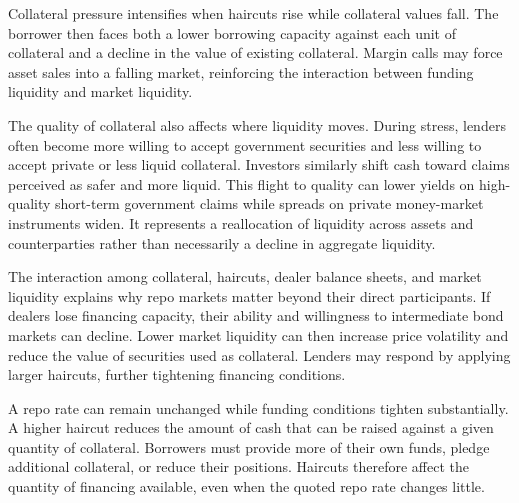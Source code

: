 Collateral pressure intensifies when haircuts rise while collateral values fall. The borrower then faces both a lower borrowing capacity against each unit of collateral and a decline in the value of existing collateral. Margin calls may force asset sales into a falling market, reinforcing the interaction between funding liquidity and market liquidity.

The quality of collateral also affects where liquidity
moves. During stress, lenders often become more willing
to accept government securities and less willing to
accept private or less liquid collateral. Investors
similarly shift cash toward claims perceived as safer
and more liquid. This flight to quality can lower
yields on high-quality short-term government claims
while spreads on private money-market instruments
widen. It represents a reallocation of liquidity
across assets and counterparties rather than
necessarily a decline in aggregate liquidity.

The interaction among collateral, haircuts, dealer
balance sheets, and market liquidity explains why
repo markets matter beyond their direct participants.
If dealers lose financing capacity, their ability
and willingness to intermediate bond markets can
decline. Lower market liquidity can then increase
price volatility and reduce the value of securities
used as collateral. Lenders may respond by applying
larger haircuts, further tightening financing
conditions.
\begin{tcolorbox}[
  enhanced,
  breakable,
  colback=white,
  colframe=FinanceBlue,
  boxrule=0.7pt,
  sharp corners,
  borderline west={2.2pt}{0pt}{FinanceBlue},
  title=\textbf{Financial Perspective: A Higher Haircut Can Tighten Funding Without a Higher Interest Rate},
  coltitle=white,
  colbacktitle=FinanceBlue,
  fonttitle=\bfseries,
  before skip=1.2em,
  after skip=1.2em
]

A repo rate can remain unchanged while funding
conditions tighten substantially. A higher haircut
reduces the amount of cash that can be raised against
a given quantity of collateral. Borrowers must provide
more of their own funds, pledge additional collateral,
or reduce their positions. Haircuts therefore affect
the quantity of financing available, even when the
quoted repo rate changes little.

\end{tcolorbox}


